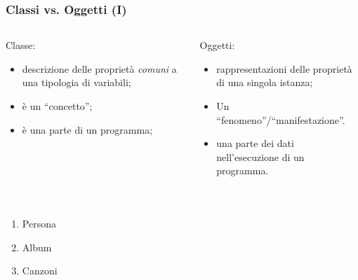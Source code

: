 \begin{frame}[fragile]\frametitle{Classi vs. Oggetti (I)}

  \begin{columns}
    \begin{column}{6cm}
      Classe:
      \begin{itemize}
	\item descrizione delle proprietà \emph{comuni} a una tipologia di variabili;
	\item \`e un ``concetto'';
	\item \`e una parte di un programma;
      \end{itemize}
      
    \end{column}

    \begin{column}{6cm}
      Oggetti:
      \begin{itemize}
	\item rappresentazioni delle proprietà di una singola istanza;
	\item Un ``fenomeno''/``manifestazione''.
	\item una parte dei dati nell'esecuzione di un programma.
      \end{itemize}
      
    \end{column}
  \end{columns}

  ${}$
  \begin{columns}[T]
    \begin{column}[T]{6cm}
      \begin{enumerate}
       \item Persona
       \item Album
       \item Canzoni
      \end{enumerate}
    \end{column}


\end{columns}
\end{frame}
